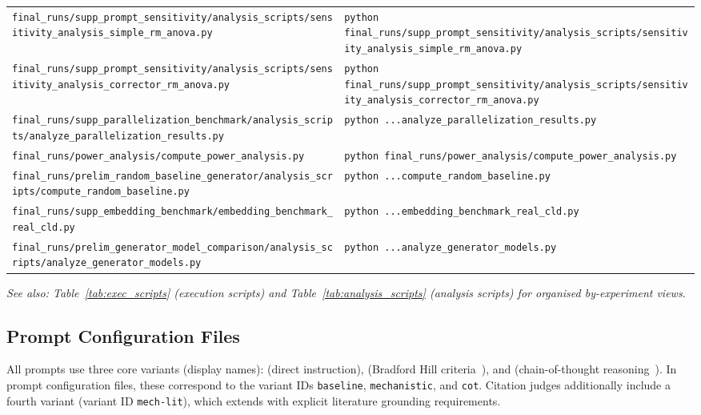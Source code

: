 \begin{table}[H]
{\begin{tabular}{@{}ll@{}}
\texttt{final\_runs/supp\_prompt\_sensitivity/analysis\_scripts/sensitivity\_analysis\_simple\_rm\_anova.py} & \texttt{python final\_runs/supp\_prompt\_sensitivity/analysis\_scripts/sensitivity\_analysis\_simple\_rm\_anova.py} \\
\texttt{final\_runs/supp\_prompt\_sensitivity/analysis\_scripts/sensitivity\_analysis\_corrector\_rm\_anova.py} & \texttt{python final\_runs/supp\_prompt\_sensitivity/analysis\_scripts/sensitivity\_analysis\_corrector\_rm\_anova.py} \\
\texttt{final\_runs/supp\_parallelization\_benchmark/analysis\_scripts/analyze\_parallelization\_results.py} & \texttt{python ...analyze\_parallelization\_results.py} \\
\texttt{final\_runs/power\_analysis/compute\_power\_analysis.py} & \texttt{python final\_runs/power\_analysis/compute\_power\_analysis.py} \\
\texttt{final\_runs/prelim\_random\_baseline\_generator/analysis\_scripts/compute\_random\_baseline.py} & \texttt{python ...compute\_random\_baseline.py} \\
\texttt{final\_runs/supp\_embedding\_benchmark/embedding\_benchmark\_real\_cld.py} & \texttt{python ...embedding\_benchmark\_real\_cld.py} \\
\texttt{final\_runs/prelim\_generator\_model\_comparison/analysis\_scripts/analyze\_generator\_models.py} & \texttt{python ...analyze\_generator\_models.py} \\
\bottomrule
\end{tabular}%
}%
\end{table}

\noindent\textit{See also: Table~\ref{tab:exec_scripts} (execution scripts) and Table~\ref{tab:analysis_scripts} (analysis scripts) for organised by-experiment views.}

\subsection{Prompt Configuration Files}

All prompts use three core variants (display names): \textit{\PromptBaseline} (direct instruction), \textit{\PromptMechanistic} (Bradford Hill criteria~\cite{shimonovich2020bradford}), and \textit{\PromptCoT} (chain-of-thought reasoning~\cite{kojima2022large}). In prompt configuration files, these correspond to the variant IDs \texttt{baseline}, \texttt{mechanistic}, and \texttt{cot}. Citation judges additionally include a fourth variant \textit{\PromptMechanisticLit} (variant ID \texttt{mech-lit}), which extends \PromptMechanistic{} with explicit literature grounding requirements.

